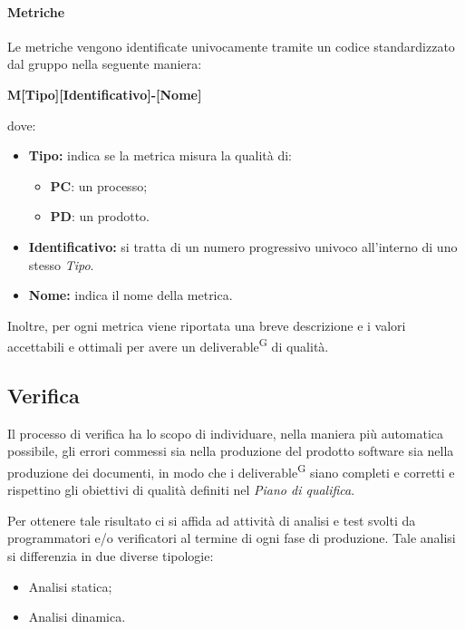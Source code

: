 \paragraph{Metriche}
Le metriche vengono identificate univocamente tramite un codice standardizzato dal gruppo nella seguente maniera:
\begin{center}
    \textbf{M[Tipo][Identificativo]-[Nome]}
\end{center}
dove:
\begin{itemize}
    \item \textbf{Tipo:} indica se la metrica misura la qualità di:
        \begin{itemize}
            \item \textbf{PC}: un processo;
            \item \textbf{PD}: un prodotto.
        \end{itemize}                 
    \item \textbf{Identificativo:} si tratta di un numero progressivo univoco all'interno di uno stesso \textit{Tipo}.
    \item \textbf{Nome:} indica il nome della metrica.
\end{itemize}
Inoltre, per ogni metrica viene riportata una breve descrizione e i valori accettabili e ottimali per avere un deliverable\textsuperscript{G} di qualità.



\subsection{Verifica}\label{sec:processi_di_supporto:verifica}
Il processo di verifica ha lo scopo di individuare, nella maniera più automatica possibile, gli errori commessi sia nella produzione del prodotto software sia nella produzione dei documenti, in modo che i deliverable\textsuperscript{G} siano completi e corretti e rispettino gli obiettivi di qualità definiti nel \textit{Piano di qualifica}.

Per ottenere tale risultato ci si affida ad attività di analisi e test svolti da programmatori e/o verificatori al termine di ogni fase di produzione. Tale analisi si differenzia in due diverse tipologie:
\begin{itemize}
    \item Analisi statica;
    \item Analisi dinamica.
\end{itemize}

